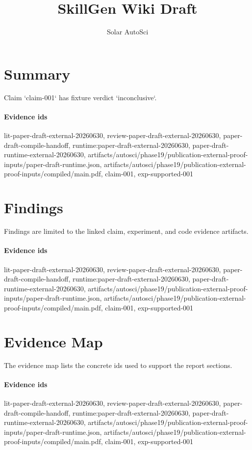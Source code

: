 \documentclass{article}
\title{SkillGen Wiki Draft}
\author{Solar AutoSci}
\date{}
\begin{document}
\maketitle

\section{Summary}
Claim `claim-001` has fixture verdict `inconclusive`.

\paragraph{Evidence ids} lit-paper-draft-external-20260630, review-paper-draft-external-20260630, paper-draft-compile-handoff, runtime:paper-draft-external-20260630, paper-draft-runtime-external-20260630, artifacts/autosci/phase19/publication-external-proof-inputs/paper-draft-runtime.json, artifacts/autosci/phase19/publication-external-proof-inputs/compiled/main.pdf, claim-001, exp-supported-001

\section{Findings}
Findings are limited to the linked claim, experiment, and code evidence artifacts.

\paragraph{Evidence ids} lit-paper-draft-external-20260630, review-paper-draft-external-20260630, paper-draft-compile-handoff, runtime:paper-draft-external-20260630, paper-draft-runtime-external-20260630, artifacts/autosci/phase19/publication-external-proof-inputs/paper-draft-runtime.json, artifacts/autosci/phase19/publication-external-proof-inputs/compiled/main.pdf, claim-001, exp-supported-001

\section{Evidence Map}
The evidence map lists the concrete ids used to support the report sections.

\paragraph{Evidence ids} lit-paper-draft-external-20260630, review-paper-draft-external-20260630, paper-draft-compile-handoff, runtime:paper-draft-external-20260630, paper-draft-runtime-external-20260630, artifacts/autosci/phase19/publication-external-proof-inputs/paper-draft-runtime.json, artifacts/autosci/phase19/publication-external-proof-inputs/compiled/main.pdf, claim-001, exp-supported-001
\end{document}
